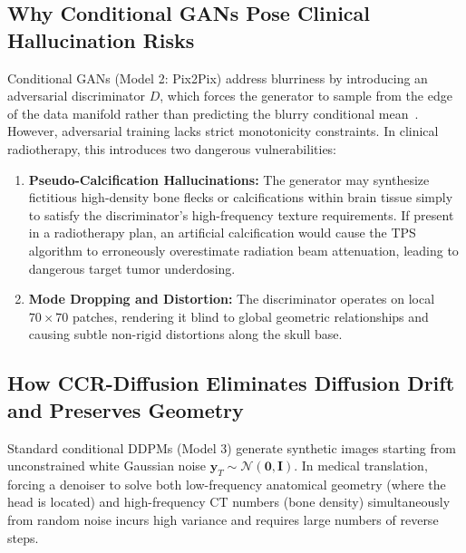 \subsection{Why Conditional GANs Pose Clinical Hallucination Risks}
Conditional GANs (Model 2: Pix2Pix) address blurriness by introducing an adversarial discriminator $D$, which forces the generator to sample from the edge of the data manifold rather than predicting the blurry conditional mean~\cite{isola2017image}. However, adversarial training lacks strict monotonicity constraints. In clinical radiotherapy, this introduces two dangerous vulnerabilities:
\begin{enumerate}
    \item \textbf{Pseudo-Calcification Hallucinations:} The generator may synthesize fictitious high-density bone flecks or calcifications within brain tissue simply to satisfy the discriminator's high-frequency texture requirements. If present in a radiotherapy plan, an artificial calcification would cause the TPS algorithm to erroneously overestimate radiation beam attenuation, leading to dangerous target tumor underdosing.
    \item \textbf{Mode Dropping and Distortion:} The discriminator operates on local $70 \times 70$ patches, rendering it blind to global geometric relationships and causing subtle non-rigid distortions along the skull base.
\end{enumerate}

\subsection{How CCR-Diffusion Eliminates Diffusion Drift and Preserves Geometry}
Standard conditional DDPMs (Model 3) generate synthetic images starting from unconstrained white Gaussian noise $\mathbf{y}_T \sim \mathcal{N}(\mathbf{0}, \mathbf{I})$. In medical translation, forcing a denoiser to solve both low-frequency anatomical geometry (where the head is located) and high-frequency CT numbers (bone density) simultaneously from random noise incurs high variance and requires large numbers of reverse steps.

